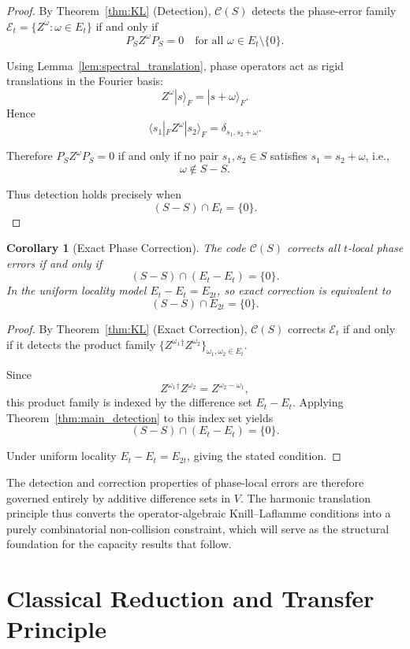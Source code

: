 \documentclass[a4paper,twocolumn,11pt,allowtoday]{quantumarticle}
\theoremstyle{plain}
\newtheorem{corollary}[theorem]{Corollary}
\theoremstyle{definition}
\theoremstyle{remark}
\begin{document}
\begin{proof}
By Theorem~\ref{thm:KL} (Detection), $\mathcal{C}(S)$ detects the phase-error family
$\mathcal{E}_t=\{Z^\omega : \omega\in E_t\}$ if and only if
\[
P_S Z^\omega P_S = 0
\quad
\text{for all } \omega\in E_t\setminus\{0\}.
\]

Using Lemma~\ref{lem:spectral_translation}, phase operators act as rigid translations
in the Fourier basis:
\[
Z^\omega |s\rangle_F = |s+\omega\rangle_F.
\]
Hence
\[
\langle s_1|_F Z^\omega |s_2\rangle_F
=
\delta_{s_1,s_2+\omega}.
\]

Therefore $P_S Z^\omega P_S=0$ if and only if no pair $s_1,s_2\in S$
satisfies $s_1 = s_2 + \omega$, i.e.,
\[
\omega \notin S-S.
\]

Thus detection holds precisely when
\[
(S-S)\cap E_t=\{0\}.
\]
\end{proof}

\begin{corollary}[Exact Phase Correction]
\label{cor:correction}
The code $\mathcal{C}(S)$ corrects all $t$-local phase errors if and only if
\[
(S-S)\cap(E_t-E_t)=\{0\}.
\]
In the uniform locality model $E_t-E_t=E_{2t}$, so exact correction is equivalent to
\[
(S-S)\cap E_{2t}=\{0\}.
\]
\end{corollary}

\begin{proof}
By Theorem~\ref{thm:KL} (Exact Correction), $\mathcal{C}(S)$ corrects
$\mathcal{E}_t$ if and only if it detects the product family
$\{Z^{\omega_1}{}^\dagger Z^{\omega_2}\}_{\omega_1,\omega_2\in E_t}$.

Since
\[
Z^{\omega_1}{}^\dagger Z^{\omega_2}
=
Z^{\omega_2-\omega_1},
\]
this product family is indexed by the difference set $E_t - E_t$.
Applying Theorem~\ref{thm:main_detection} to this index set yields
\[
(S-S)\cap(E_t-E_t)=\{0\}.
\]

Under uniform locality $E_t - E_t = E_{2t}$, giving the stated condition.
\end{proof}

The detection and correction properties of phase-local errors are therefore governed entirely by additive difference sets in $V$. The harmonic translation principle thus converts the operator-algebraic Knill--Laflamme conditions into a purely combinatorial non-collision constraint, which will serve as the structural foundation for the capacity results that follow.




\section{Classical Reduction and Transfer Principle}
\label{sec:classical_reduction}
\end{document}
